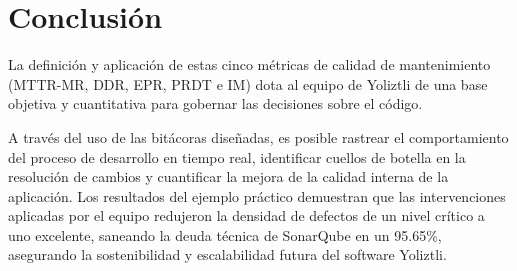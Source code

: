 \documentclass[12pt]{article}
\begin{document}
\section{Conclusión}

La definición y aplicación de estas cinco métricas de calidad de mantenimiento (MTTR-MR, DDR, EPR, PRDT e IM) dota al equipo de Yoliztli de una base objetiva y cuantitativa para gobernar las decisiones sobre el código. 

A través del uso de las bitácoras diseñadas, es posible rastrear el comportamiento del proceso de desarrollo en tiempo real, identificar cuellos de botella en la resolución de cambios y cuantificar la mejora de la calidad interna de la aplicación. Los resultados del ejemplo práctico demuestran que las intervenciones aplicadas por el equipo redujeron la densidad de defectos de un nivel crítico a uno excelente, saneando la deuda técnica de SonarQube en un 95.65\%, asegurando la sostenibilidad y escalabilidad futura del software Yoliztli.
\end{document}
